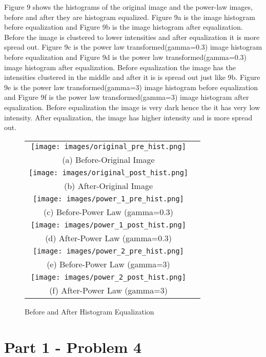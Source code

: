\documentclass[conference]{IEEEtran}
\begin{document}
Figure 9 shows the histograms of the original image and the power-law images, before and after they are histogram equalized.
\bigbreak
Figure 9a is the image histogram before equalization and Figure 9b is the image histogram after equalization. Before the image is clustered to lower intensities and after equalization it is more spread out.
\bigbreak
Figure 9c is the power law transformed(gamma=0.3) image histogram before equalization and Figure 9d is the power law transformed(gamma=0.3) image histogram after equalization. Before equalization the image has the intensities clustered in the middle and after it is is spread out just like 9b.
\bigbreak
Figure 9e is the power law transformed(gamma=3) image histogram before equalization and Figure 9f is the power law transformed(gamma=3) image histogram after equalization. Before equalization the image is very dark hence the it has very low intensity. After equalization, the image has higher intensity and is more spread out.
\bigbreak

\begin{figure}
    \begin{tabular}{cc}
        \texttt{[image: images/original\_pre\_hist.png]} \\
        (a) Before-Original Image \\ [2pt]
        \texttt{[image: images/original\_post\_hist.png]} \\
        (b) After-Original Image \\[2pt]
        \texttt{[image: images/power\_1\_pre\_hist.png]} \\
        (c) Before-Power Law (gamma=0.3) \\[2pt]
        \texttt{[image: images/power\_1\_post\_hist.png]} \\
        (d) After-Power Law (gamma=0.3) \\[2pt]
        \texttt{[image: images/power\_2\_pre\_hist.png]} \\
        (e) Before-Power Law (gamma=3) \\[2pt]
        \texttt{[image: images/power\_2\_post\_hist.png]} \\
        (f) After-Power Law (gamma=3) \\[2pt]
    \end{tabular}
    \caption{Before and After Histogram Equalization}
\end{figure}

\section*{Part 1 - Problem 4}
\end{document}

